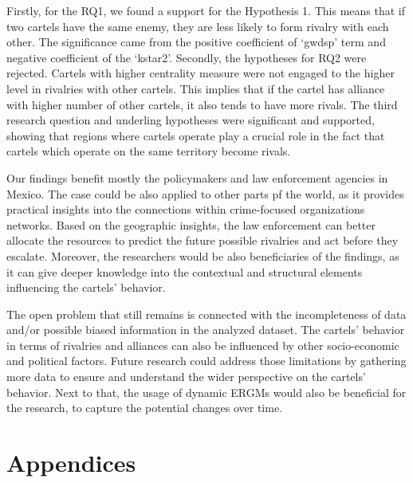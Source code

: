 \documentclass[
]{article}
\begin{document}
Firstly, for the RQ1, we found a support for the Hypothesis 1. This
means that if two cartels have the same enemy, they are less likely to
form rivalry with each other. The significance came from the positive
coefficient of `gwdsp' term and negative coefficient of the `kstar2'.
Secondly, the hypotheses for RQ2 were rejected. Cartels with higher
centrality measure were not engaged to the higher level in rivalries
with other cartels. This implies that if the cartel has alliance with
higher number of other cartels, it also tends to have more rivals. The
third research question and underling hypotheses were significant and
supported, showing that regions where cartels operate play a crucial
role in the fact that cartels which operate on the same territory become
rivals.

Our findings benefit mostly the policymakers and law enforcement
agencies in Mexico. The case could be also applied to other parts pf the
world, as it provides practical insights into the connections within
crime-focused organizations networks. Based on the geographic insights,
the law enforcement can better allocate the resources to predict the
future possible rivalries and act before they escalate. Moreover, the
researchers would be also beneficiaries of the findings, as it can give
deeper knowledge into the contextual and structural elements influencing
the cartels' behavior.

The open problem that still remains is connected with the incompleteness
of data and/or possible biased information in the analyzed dataset. The
cartels' behavior in terms of rivalries and alliances can also be
influenced by other socio-economic and political factors. Future
research could address those limitations by gathering more data to
ensure and understand the wider perspective on the cartels' behavior.
Next to that, the usage of dynamic ERGMs would also be beneficial for
the research, to capture the potential changes over time.

\section{Appendices}\label{appendices}
\end{document}
